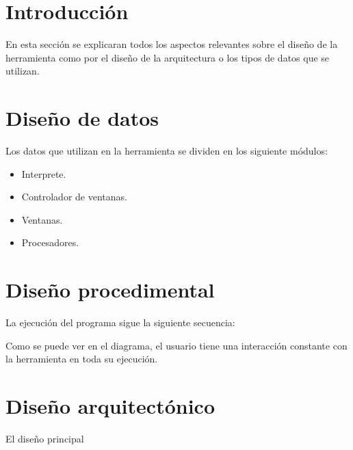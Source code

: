 
\section{Introducción}
En esta sección se explicaran todos los aspectos relevantes sobre el diseño de la herramienta como por el diseño de la arquitectura o los tipos de datos que se utilizan.

\section{Diseño de datos}
Los datos que utilizan en la herramienta se dividen en los siguiente módulos:
\begin{itemize}
	\item Interprete.
	\item Controlador de ventanas. 
	\item Ventanas. 
	\item Procesadores.
\end{itemize}




\section{Diseño procedimental}
La ejecución del programa sigue la siguiente secuencia:



Como se puede ver en el diagrama, el usuario tiene una interacción constante con la herramienta en toda su ejecución.
\section{Diseño arquitectónico}
El diseño  principal 
